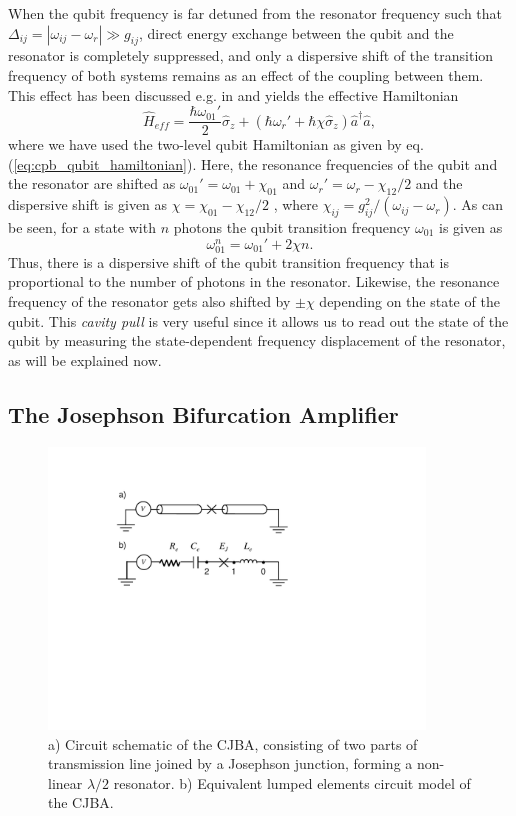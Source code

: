 When the qubit frequency is far detuned from the resonator frequency such that $\Delta_{ij}=|\omega_{ij}-\omega_r| \gg g_{ij}$, direct energy exchange between the qubit and the resonator is completely suppressed, and only a dispersive shift of the transition frequency of both systems remains as an effect of the coupling between them. This effect has been discussed e.g. in \cite{blais_cavity_2004,koch_charge-insensitive_2007} and yields the effective Hamiltonian
%
\begin{equation}
\hat{H}_{eff} = \frac{\hbar\omega_{01}'}{2}\hat{\sigma}_z+(\hbar\omega_r'+\hbar \chi \hat{\sigma}_z)\hat{a}^\dagger \hat{a}, \label{eq:dispersive_interaction}
\end{equation}
%
where we have used the two-level qubit Hamiltonian as given by eq. (\ref{eq:cpb_qubit_hamiltonian}). Here, the resonance frequencies of the qubit and the resonator are shifted as $\omega_{01}'=\omega_{01}+\chi_{01}$ and $\omega_r' = \omega_{r}-\chi_{12}/2$ and the dispersive shift is given as $\chi=\chi_{01}-\chi_{12}/2$ \citep{koch_charge-insensitive_2007}, where $\chi_{ij}=g_{ij}^2/(\omega_{ij}-\omega_r)$. As can be seen, for a state with $n$ photons the qubit transition frequency $\omega_{01}$ is given as
%
\begin{equation}
\omega_{01}^n = \omega_{01}'+2\chi n. \label{eq:stark_shift}
\end{equation}
%
Thus, there is a dispersive shift of the qubit transition frequency that is proportional to the number of photons in the resonator. Likewise, the resonance frequency of the resonator gets also shifted by $\pm\chi$ depending on the state of the qubit. This {\it cavity pull} is very useful since it allows us to read out the state of the qubit by measuring the state-dependent frequency displacement of the resonator, as will be explained now.

\subsection{The Josephson Bifurcation Amplifier} \label{section:cjba}

\begin{figure}
	\includegraphics[width=10cm]{"./material/figures/introduction/jba"}
	\caption{a) Circuit schematic of the CJBA, consisting of two parts of transmission line joined by a Josephson junction, forming a non-linear $\lambda/2$ resonator. b) Equivalent lumped elements circuit model of the CJBA.}
	\label{fig:cba_schematic}
\end{figure}

